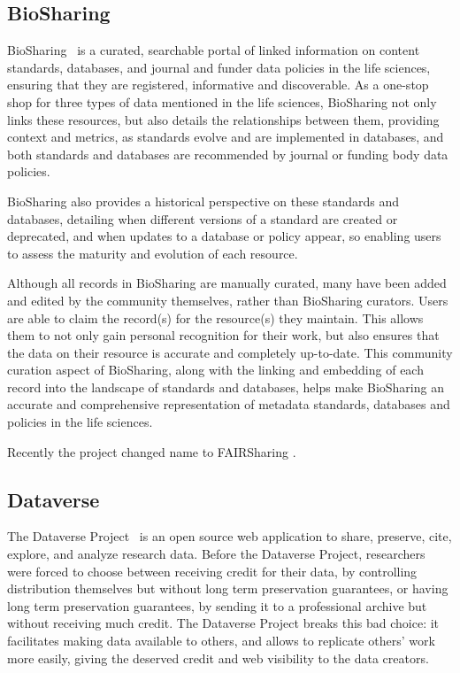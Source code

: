 \subsection*{BioSharing}
BioSharing~\cite{biosharing} is a curated, searchable portal of linked information on content standards,
databases, and journal and funder data policies in the life sciences, ensuring that
they are registered, informative and discoverable.
As a one-stop shop for three types of data mentioned in the life sciences, BioSharing not only links these resources, but also details the relationships between them, providing context and metrics, as standards evolve and are implemented in databases, and both standards and databases are recommended by journal or funding body data policies.

BioSharing also provides a historical perspective on these standards and databases,
detailing when different versions of a standard are created or deprecated, and when
updates to a database or policy appear, so enabling users to assess the maturity and
evolution of each resource.

Although all records in BioSharing are manually curated, many have been added and
edited by the community themselves, rather than BioSharing curators.
Users are able to claim the record(s) for the resource(s) they maintain.
This allows them to not only gain personal recognition for their work, but also ensures
that the data on their resource is accurate and completely up-to-date.
This community curation aspect of BioSharing, along with the linking and embedding of
each record into the landscape of standards and databases, helps make BioSharing an
accurate and comprehensive representation of metadata standards, databases and policies
in the life sciences.

Recently the project changed name to FAIRSharing \cite{fairsharing}.

\subsection*{Dataverse}
The Dataverse Project~\cite{dataverse} is an open source web application to share, preserve, cite, explore, and analyze research data.
Before the Dataverse Project, researchers were forced to choose between receiving credit for their data, by controlling distribution themselves but without long term preservation guarantees, or having long term preservation guarantees, by sending it to a professional archive but without receiving much credit.
The Dataverse Project breaks this bad choice: it facilitates making data available to others, and allows to replicate others' work more easily, giving the deserved credit and web visibility to the data creators.

